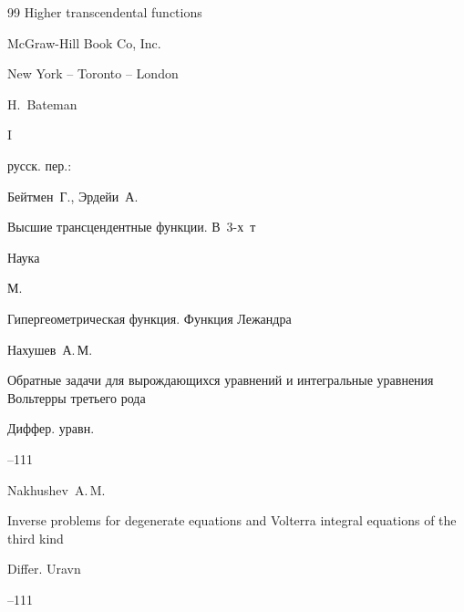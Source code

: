 \begin{thebibliography}{99}
\book Higher transcendental functions


\publ McGraw-Hill Book Co, Inc.

\publaddr New York -- Toronto -- London

\ed H.~Bateman

\bookvol I



\rtransl

русск. пер.:~

\by Бейтмен~Г., Эрдейи~А.

\book Высшие трансцендентные функции. \mbox{В~3-х~т}


\publ Наука

\publaddr М.


\voltitle Гипергеометрическая функция. Функция Лежандра







\by Нахушев~А.\,М.

\paper Обратные задачи для вырождающихся уравнений и интегральные уравнения Вольтерры третьего рода

\jour Диффер. уравн.

--111




\misctransl

\by Nakhushev~A.\,M.

\paper Inverse problems for degenerate equations and Volterra integral equations of the third kind

\jour  Differ. Uravn

--111








\end{thebibliography}





\noindent

\hskip6.5cm \thedate \par\noindent

\hskip6.5cm\therevdate





\makeengtitlem



\newpage



%

